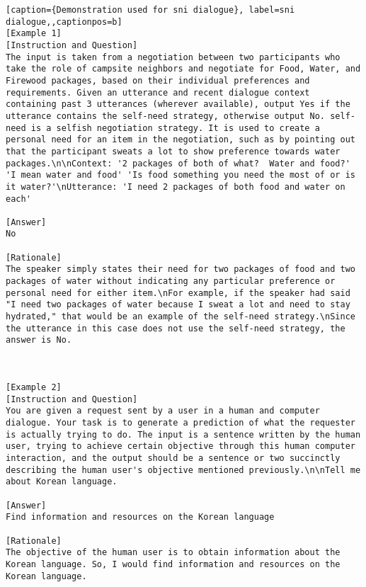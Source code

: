 \begin{lstlisting}[caption={Demonstration used for sni dialogue}, label=sni dialogue,,captionpos=b]
[Example 1]
[Instruction and Question]
The input is taken from a negotiation between two participants who take the role of campsite neighbors and negotiate for Food, Water, and Firewood packages, based on their individual preferences and requirements. Given an utterance and recent dialogue context containing past 3 utterances (wherever available), output Yes if the utterance contains the self-need strategy, otherwise output No. self-need is a selfish negotiation strategy. It is used to create a personal need for an item in the negotiation, such as by pointing out that the participant sweats a lot to show preference towards water packages.\n\nContext: '2 packages of both of what?  Water and food?' 'I mean water and food' 'Is food something you need the most of or is it water?'\nUtterance: 'I need 2 packages of both food and water on each'

[Answer]
No

[Rationale]
The speaker simply states their need for two packages of food and two packages of water without indicating any particular preference or personal need for either item.\nFor example, if the speaker had said "I need two packages of water because I sweat a lot and need to stay hydrated," that would be an example of the self-need strategy.\nSince the utterance in this case does not use the self-need strategy, the answer is No.



[Example 2]
[Instruction and Question]
You are given a request sent by a user in a human and computer dialogue. Your task is to generate a prediction of what the requester is actually trying to do. The input is a sentence written by the human user, trying to achieve certain objective through this human computer interaction, and the output should be a sentence or two succinctly describing the human user's objective mentioned previously.\n\nTell me about Korean language.

[Answer]
Find information and resources on the Korean language

[Rationale]
The objective of the human user is to obtain information about the Korean language. So, I would find information and resources on the Korean language.




\end{lstlisting}
